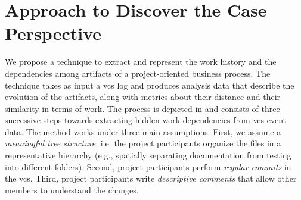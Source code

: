 \section{Approach to Discover the Case Perspective}
\label{sec:bpm2017approach}



We propose a technique to extract and represent the work history and the dependencies among artifacts of a project-oriented business process. The technique takes as input a \gls{vcs} log and produces analysis data that describe the evolution of the artifacts, along with metrics about their distance and their similarity in terms of work.
The process is depicted in  and consists of three successive steps towards extracting hidden work dependencies from \gls{vcs} event data. The method works under three main assumptions. First, we assume a \emph{meaningful tree structure}, i.e. the project participants organize the files in a representative hierarchy (e.g., spatially separating documentation from testing into different folders). Second, project participants perform \emph{regular commits} in the \gls{vcs}. Third, project participants write \emph{descriptive comments} that allow other members to understand the changes.


